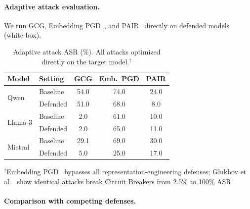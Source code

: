 \paragraph{Adaptive attack evaluation.}
\label{sec:adaptive}

We run GCG, Embedding PGD~\citep{madry2018towards}, and PAIR~\citep{pair} directly on defended models (white-box).

\begin{table}[t]
\centering
\caption{Adaptive attack ASR (\%). All attacks optimized directly on the target model.$^\dagger$}
\label{tab:adaptive-attack}
\begin{tabular}{llccc}
\toprule
\textbf{Model} & \textbf{Setting} & \textbf{GCG} & \textbf{Emb.\ PGD} & \textbf{PAIR} \\
\midrule
\multirow{2}{*}{Qwen}    & Baseline & 54.0 & 74.0 & 24.0 \\
                          & Defended & 51.0 & 68.0 & 8.0 \\
\midrule
\multirow{2}{*}{Llama-3} & Baseline & 2.0  & 61.0 & 10.0 \\
                          & Defended & 2.0  & 65.0 & 11.0 \\
\midrule
\multirow{2}{*}{Mistral}  & Baseline & 29.1 & 69.0 & 30.0 \\
                          & Defended & 5.0  & 25.0 & 17.0 \\
\bottomrule
\end{tabular}
\vspace{2pt}
{\small $^\dagger$Embedding PGD~\citep{madry2018towards} bypasses all representation-engineering defenses; Glukhov et al.~\citep{revisiting_cb} show identical attacks break Circuit Breakers from 2.5\% to 100\% ASR.}
\end{table}

\paragraph{Comparison with competing defenses.}

